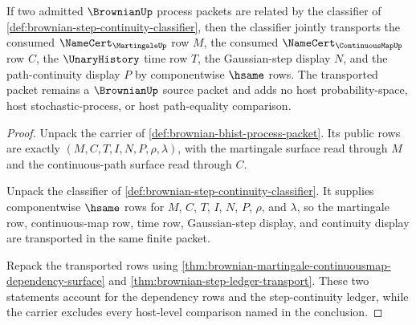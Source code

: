 \begin{theorem}
\label{thm:brownian-continuity-martingale-joint-classifier}
If two admitted $\BrownianUp$ process packets are related by the classifier of
\autoref{def:brownian-step-continuity-classifier}, then the classifier jointly
transports the consumed $\NameCert_{\MartingaleUp}$ row $M$, the consumed
$\NameCert_{\ContinuousMapUp}$ row $C$, the $\UnaryHistory$ time row $T$, the
Gaussian-step display $N$, and the path-continuity display $P$ by
componentwise $\hsame$ rows. The transported packet remains a
$\BrownianUp$ source packet and adds no host probability-space, host
stochastic-process, or host path-equality comparison.
\end{theorem}
\begin{proof}
Unpack the carrier of \autoref{def:brownian-bhist-process-packet}. Its public
rows are exactly $(M,C,T,I,N,P,\rho,\lambda)$, with the martingale surface read
through $M$ and the continuous-path surface read through $C$.

Unpack the classifier of \autoref{def:brownian-step-continuity-classifier}.
It supplies componentwise $\hsame$ rows for $M$, $C$, $T$, $I$, $N$, $P$,
$\rho$, and $\lambda$, so the martingale row, continuous-map row, time row,
Gaussian-step display, and continuity display are transported in the same
finite packet.

Repack the transported rows using
\autoref{thm:brownian-martingale-continuousmap-dependency-surface} and
\autoref{thm:brownian-step-ledger-transport}. These two statements account
for the dependency rows and the step-continuity ledger, while the carrier
excludes every host-level comparison named in the conclusion.
\end{proof}

